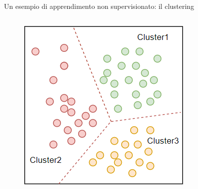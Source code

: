 \begin{frame}
\begin{block}{Un esempio di apprendimento non supervisionato: il clustering}
\begin{columns}
			\begin{figure}[!htbp]
				\centering
				\includegraphics[width=1.0\linewidth]{images/glossary/unsupervised_learning_1_2.png}
			\end{figure}	
		\end{columns}

	\end{block}

\end{frame}


